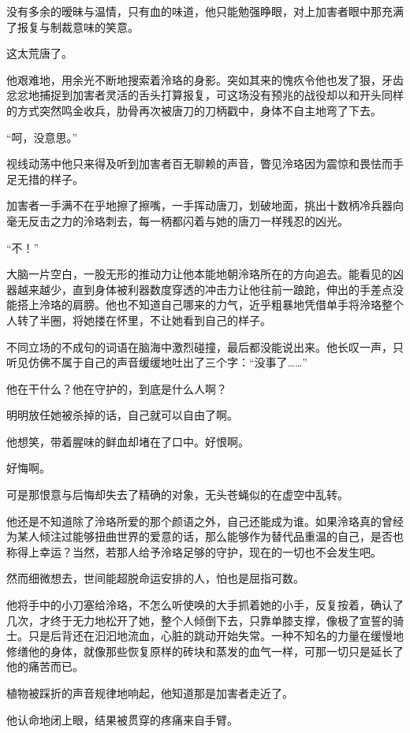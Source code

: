 \documentclass[UTF8, scheme = chinese, openany]{ctexbook}
\begin{document}
没有多余的暧昧与温情，只有血的味道，他只能勉强睁眼，对上加害者眼中那充满了报复与制裁意味的笑意。

这太荒唐了。

他艰难地，用余光不断地搜索着泠珞的身影。突如其来的愧疚令他也发了狠，牙齿忿忿地捕捉到加害者灵活的舌头打算报复，可这场没有预兆的战役却以和开头同样的方式突然鸣金收兵，肋骨再次被唐刀的刀柄戳中，身体不自主地弯了下去。

“呵，没意思。”

视线动荡中他只来得及听到加害者百无聊赖的声音，瞥见泠珞因为震惊和畏怯而手足无措的样子。

加害者一手满不在乎地擦了擦嘴，一手挥动唐刀，划破地面，挑出十数柄冷兵器向毫无反击之力的泠珞刺去，每一柄都闪着与她的唐刀一样残忍的凶光。

“不！”

大脑一片空白，一股无形的推动力让他本能地朝泠珞所在的方向追去。能看见的凶器越来越少，直到身体被利器数度穿透的冲击力让他往前一踉跄，伸出的手差点没能搭上泠珞的肩膀。他也不知道自己哪来的力气，近乎粗暴地凭借单手将泠珞整个人转了半圈，将她搂在怀里，不让她看到自己的样子。

不同立场的不成句的词语在脑海中激烈碰撞，最后都没能说出来。他长叹一声，只听见仿佛不属于自己的声音缓缓地吐出了三个字：“没事了……”

他在干什么？他在守护的，到底是什么人啊？

明明放任她被杀掉的话，自己就可以自由了啊。

他想笑，带着腥味的鲜血却堵在了口中。好恨啊。

好悔啊。

可是那恨意与后悔却失去了精确的对象，无头苍蝇似的在虚空中乱转。

他还是不知道除了泠珞所爱的那个颜语之外，自己还能成为谁。如果泠珞真的曾经为某人倾注过能够扭曲世界的爱意的话，那么能够作为替代品重温的自己，是否也称得上幸运？当然，若那人给予泠珞足够的守护，现在的一切也不会发生吧。

然而细微想去，世间能超脱命运安排的人，怕也是屈指可数。

他将手中的小刀塞给泠珞，不怎么听使唤的大手抓着她的小手，反复按着，确认了几次，才终于无力地松开了她，整个人倾倒下去，只靠单膝支撑，像极了宣誓的骑士。只是后背还在汩汩地流血，心脏的跳动开始失常。一种不知名的力量在缓慢地修缮他的身体，就像那些恢复原样的砖块和蒸发的血气一样，可那一切只是延长了他的痛苦而已。

植物被踩折的声音规律地响起，他知道那是加害者走近了。

他认命地闭上眼，结果被贯穿的疼痛来自手臂。
\end{document}
